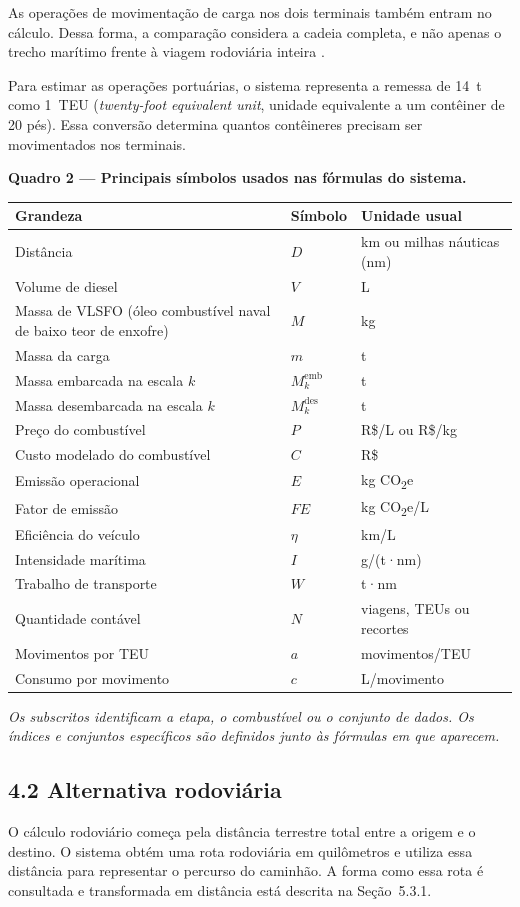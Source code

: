 \documentclass[brazil,]{article}
\let\oldsubsection\subsection
\renewcommand{\subsection}{\Needspace{12\baselineskip}\oldsubsection}
\newcommand{\keeptable}{\Needspace{0.64\textheight}}
\begin{document}
As operações de movimentação de carga nos dois terminais também entram
no cálculo. Dessa forma, a comparação considera a cadeia completa, e não
apenas o trecho marítimo frente à viagem rodoviária inteira
\parencite{shortsea2019,competitiveness2024}.

Para estimar as operações portuárias, o sistema representa a remessa de
14~t como 1~TEU (\emph{twenty-foot equivalent unit}, unidade equivalente
a um contêiner de 20 pés). Essa conversão determina quantos contêineres
precisam ser movimentados nos terminais.

\keeptable
\textbf{Quadro 2 --- Principais símbolos usados nas fórmulas do
sistema.}

\begingroup
\setlength{\tabcolsep}{3pt}
\begin{longtable}[]{@{}lll@{}}
\toprule
Grandeza & Símbolo & Unidade usual\tabularnewline
\midrule
\endhead
Distância & \(D\) & km ou milhas náuticas (nm)\tabularnewline
Volume de diesel & \(V\) & L\tabularnewline
Massa de VLSFO (óleo combustível naval de baixo teor de enxofre) & \(M\)
& kg\tabularnewline
Massa da carga & \(m\) & t\tabularnewline
Massa embarcada na escala \(k\) & \(M_k^{\mathrm{emb}}\) & t\tabularnewline
Massa desembarcada na escala \(k\) & \(M_k^{\mathrm{des}}\) &
t\tabularnewline
Preço do combustível & \(P\) & R\$/L ou R\$/kg\tabularnewline
Custo modelado do combustível & \(C\) & R\$\tabularnewline
Emissão operacional & \(E\) & kg CO\textsubscript{2}e\tabularnewline
Fator de emissão & \(FE\) & kg CO\textsubscript{2}e/L\tabularnewline
Eficiência do veículo & \(\eta\) & km/L\tabularnewline
Intensidade marítima & \(I\) & g/(t·nm)\tabularnewline
Trabalho de transporte & \(W\) & t·nm\tabularnewline
Quantidade contável & \(N\) & viagens, TEUs ou recortes\tabularnewline
Movimentos por TEU & \(a\) & movimentos/TEU\tabularnewline
Consumo por movimento & \(c\) & L/movimento\tabularnewline
\bottomrule
\end{longtable}
\endgroup

\emph{Os subscritos identificam a etapa, o combustível ou o conjunto de
dados. Os índices e conjuntos específicos são definidos junto às
fórmulas em que aparecem.}

\hypertarget{alternativa-rodoviuxe1ria}{%
\subsection{4.2 Alternativa
rodoviária}\label{alternativa-rodoviuxe1ria}}

O cálculo rodoviário começa pela distância terrestre total entre a
origem e o destino. O sistema obtém uma rota rodoviária em quilômetros e
utiliza essa distância para representar o percurso do caminhão. A forma
como essa rota é consultada e transformada em distância está descrita na
Seção~5.3.1.
\end{document}
